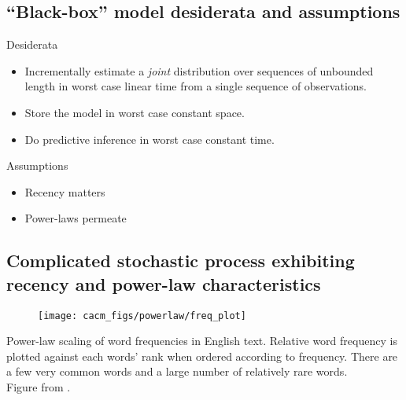 \documentclass[16pt]{beamer}
\begin{document}
\subsection{``Black-box'' model desiderata and assumptions}
\begin{frame}[t]{}
Desiderata
\begin{itemize}
\item Incrementally estimate a {\em joint} distribution over sequences of unbounded length in worst case linear time from a single sequence of observations.
\item Store the model in worst case constant space.
\item Do predictive inference in worst case constant time.
\end{itemize}
Assumptions
\begin{itemize}
\item Recency matters
\item Power-laws permeate
\end{itemize}
\end{frame}	


\subsection{Complicated stochastic process exhibiting recency and power-law characteristics}
\begin{frame}[t]{}
\begin{figure}[t]
    \begin{center}
        \texttt{[image: cacm\_figs/powerlaw/freq\_plot]}
    \end{center}
    \label{fig:powerlaw}
\end{figure}
Power-law scaling of word frequencies in
    English text. Relative word frequency  is plotted against each words' rank when ordered according to
    frequency. There are a few very common words and a large
    number of relatively rare words. \\ {\tiny Figure from \cite{Wood2011}}.
\end{frame}	
\end{document}
